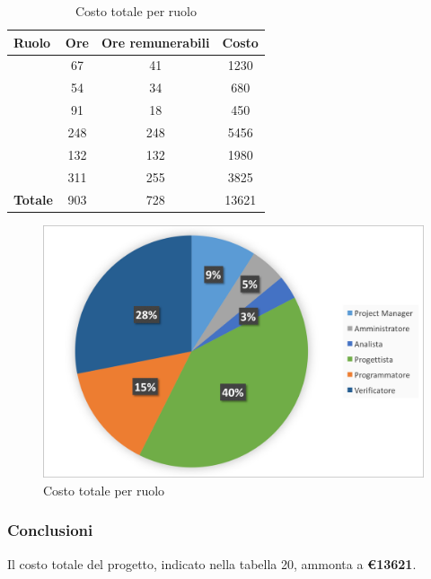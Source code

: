 \begin{table}[h]
	\begin{center}
		\begin{tabular}{|l|c|c|c|}
			\hline
			\textbf{Ruolo}	& \textbf{Ore} &	\textbf{Ore remunerabili}	 &\textbf{Costo} \\
			\hline
			\textit{\Pm}	&	67	&	41	&	1230	\\
			\hline
			\textit{\Am}	&	54	&	34	&	680	\\
			\hline
			\textit{\An}	&	91	&	18	&	450	\\
			\hline
			\textit{\Prog}	&	248	&	248	&	5456	\\
			\hline
			\textit{\Progr}	&	132	&	132	&	1980	\\
			\hline
			\textit{\Ver}	&	311	&	255	&	3825	\\
			\hline
			\textbf{Totale}	&	903	&	728	&	13621	\\
			\hline
		\end{tabular}
	\end{center}
	\caption{Costo totale per ruolo}
\end{table}

\begin{figure}[H]
	\centering 
	\includegraphics[scale=0.7]{Immagini/GraficiTorteSezione6/TOT.png}
	\caption{Costo totale per ruolo}
\end{figure}

\subsubsection{Conclusioni}
Il costo totale del progetto, indicato nella tabella 20, ammonta a \textbf{\euro 13621}.\\